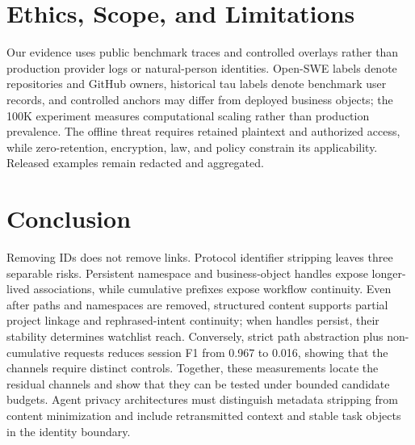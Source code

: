 \documentclass[letterpaper]{article}
\begin{document}
\section{Ethics, Scope, and Limitations}

Our evidence uses public benchmark traces and controlled overlays rather than production provider
logs or natural-person identities. Open-SWE labels denote repositories and GitHub owners,
historical tau labels denote benchmark user records, and controlled anchors may differ from deployed
business objects; the 100K experiment measures computational scaling rather than production
prevalence. The offline threat requires retained plaintext and authorized access, while zero-retention,
encryption, law, and policy constrain its applicability. Released examples remain redacted and
aggregated.

\section{Conclusion}

Removing IDs does not remove links. Protocol identifier stripping leaves three separable risks.
Persistent namespace and business-object handles expose longer-lived associations, while cumulative
prefixes expose workflow continuity. Even after paths and namespaces are removed, structured content
supports partial project linkage and rephrased-intent continuity; when handles persist, their stability
determines watchlist reach.
Conversely, strict path abstraction plus non-cumulative requests reduces session F1 from 0.967 to
0.016, showing that the channels require distinct controls. Together, these measurements locate the
residual channels and show that they can be tested under bounded candidate budgets. Agent privacy
architectures must distinguish metadata stripping from content minimization and include retransmitted
context and stable task objects in the identity boundary\label{paper:body-end}.


\end{document}
